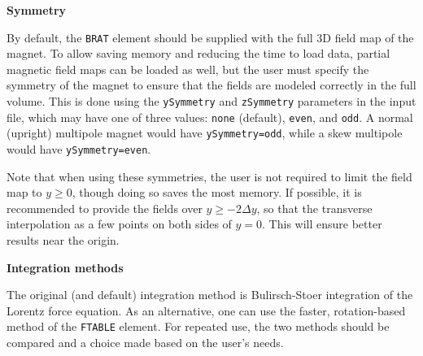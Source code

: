 {\bf Symmetry}

By default, the \verb|BRAT| element should be supplied with the full 3D field map of the magnet.
To allow saving memory and reducing the time to load data, partial magnetic field maps can be 
loaded as well, but the user must specify the symmetry of the magnet to ensure that the fields are
modeled correctly in the full volume.
This is done using the \verb|ySymmetry| and \verb|zSymmetry| parameters in the input file, which may have one of three
values: \verb|none| (default), \verb|even|, and \verb|odd|.  
A normal (upright) multipole magnet would have
\verb|ySymmetry=odd|, while a skew multipole would have \verb|ySymmetry=even|.

Note that when using these symmetries, the user is not required to limit the field map to $y\geq 0$, 
though doing so saves the most memory.
If possible, it is recommended to provide the fields over $y\geq -2\Delta y$,
so that the transverse interpolation as a few points on both sides of $y=0$.
This will ensure better results near the origin.

{\bf Integration methods}

The original (and default) integration method is Bulirsch-Stoer integration of the Lorentz force equation.
As an alternative, one can use the faster, rotation-based method of the \verb|FTABLE| element.
For repeated use, the two methods should be compared and a choice made based on the user's needs.
